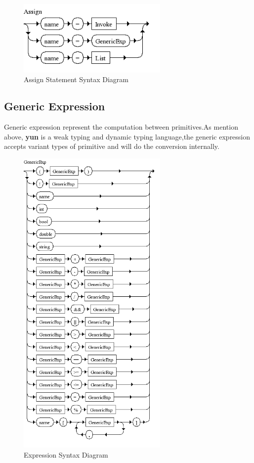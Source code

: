 \begin{figure}[h!]
  \centering
	\includegraphics[width=0.65\textwidth]{pic/c4/assign.png}
	\caption{Assign Statement Syntax Diagram}
\end{figure}

\subsection{Generic Expression}
Generic expression represent the computation between primitives.As mention above, \textbf{yun} is  a weak typing and dynamic typing language,the generic expression accepts variant types of primitive and will do the conversion internally.


\begin{figure}[h!]
  \centering
	\includegraphics[width=0.65\textwidth]{pic/c4/generic_exp.png}
	\caption{Expression Syntax Diagram}
\end{figure}


